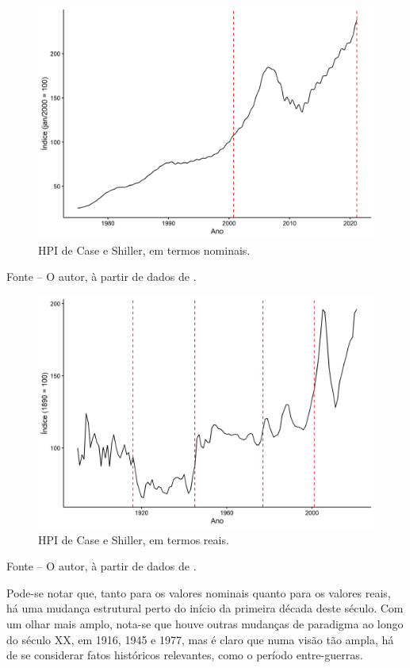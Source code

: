 \documentclass[
	12pt,				%
	oneside,			%
	a4paper,			%
	chapter=TITLE,		%
	section=TITLE,		%
	english,			%
	brazil				%
	]{abntex2}
\newcommand{\bcenter}{\begin{center}}
\newcommand{\ecenter}{\end{center}}
\begin{document}
\begin{refsection}
\begin{figure}[H]
{\centering \includegraphics[width=0.7\linewidth]{images/nhpi-1} 

}

\caption{\gls{HPI} de Case e Shiller, em termos nominais.}\label{fig:nhpi}
\end{figure}
\bcenter

\small Fonte -- O autor, à partir de dados de \textcite{QuandlWIKI}.
\ecenter
\begin{figure}[H]

{\centering \includegraphics[width=0.7\linewidth]{images/rhpi-1} 

}

\caption{\gls{HPI} de Case e Shiller, em termos reais.}\label{fig:rhpi}
\end{figure}
\bcenter

\small Fonte -- O autor, à partir de dados de \textcite{QuandlWIKI}.
\ecenter

Pode-se notar que, tanto para os valores nominais quanto para os valores reais,
há uma mudança estrutural perto do início da primeira década deste século. Com
um olhar mais amplo, nota-se que houve outras mudanças de paradigma ao longo do
século XX, em 1916, 1945 e 1977, mas é claro que numa visão tão ampla, há de
se considerar fatos históricos relevantes, como o período entre-guerras.


\end{refsection}
\end{document}
